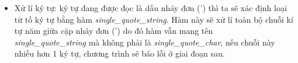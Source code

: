\begin{itemize}








  \item Xử lí ký tự: ký tự đang được đọc là dấu nháy đơn (') thì ta sẽ xác định loại từ tố ký tự bằng hàm \textit{single\_quote\_string}. Hàm này sẽ xử lí toàn bộ chuỗi kí tự năm giữa cặp nháy đơn (') do đó hàm vẫn mang tên \\\textit{single\_quote\_string} mà không phải là \textit{single\_quote\_char}, nếu chuỗi này nhiều hơn 1 ký tự, chương trình sẽ báo lỗi ở giai đoạn sau.


\end{itemize}
